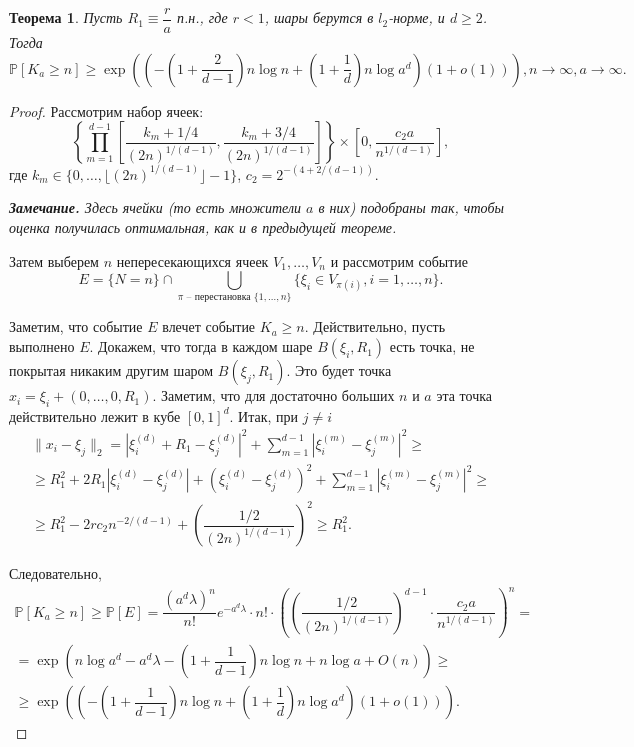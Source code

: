 \documentclass[12pt]{article}
\theoremstyle{plain}
\newtheorem{thm}{Теорема} %
\theoremstyle{definition}
\theoremstyle{remark}
\def\geq{\geqslant}
\newcommand{\PP}{\mathbb{P}}
\begin{document}
\begin{thm}
Пусть $R_1\equiv \dfrac{r}{a}$ п.н., где $r<1$, шары берутся в $l_2$-норме, и $d\geq 2$. Тогда $$\PP[K_a \geq n] \geq \exp \left(\left(-\left(1+\dfrac{2}{d-1}\right)n\log n + \left(1 + \dfrac{1}{d}\right) n\log a^d \right)(1 + o(1))\right), n \to \infty, a\to \infty.$$
\end{thm}{}

\begin{proof}
 Рассмотрим набор ячеек: $$\left\{\prod\limits_{m=1}^{d-1}\left[\dfrac{k_m+1/4}{(2n)^{1/(d-1)}}, \dfrac{k_m+3/4}{(2n)^{1/(d-1)}}\right]\right\} \times \left[0, \dfrac{c_2a}{n^{1/(d-1)}}\right],$$
    где $k_m \in \{0, \ldots, \lfloor (2n)^{1/(d-1)}\rfloor-1\}$, $c_2 = 2^{-(4+2/(d-1))}$. 
    
    {\it {\bf Замечание.}  Здесь ячейки (то есть множители $a$ в них) подобраны так, чтобы оценка получилась оптимальная, как и в предыдущей теореме.}
    
    Затем выберем $n$ непересекающихся ячеек $V_1, \ldots, V_n$  и рассмотрим событие $$E = \{N=n\}\cap \bigcup\limits_{\pi \text{ -- перестановка } \{1, \ldots, n\}} \{\xi_i \in V_{\pi(i)}, i = 1, \ldots, n\}.$$
    
                         
    Заметим, что событие $E$ влечет событие $K_a \geq n$. Действительно, пусть выполнено $E$. Докажем, что тогда в каждом шаре $B(\xi_i, R_1)$ есть точка, не покрытая никаким другим шаром $B(\xi_j, R_1)$. Это будет точка $x_i = \xi_i + (0, \ldots, 0, R_1)$. Заметим, что для достаточно больших $n$ и $a$ эта точка действительно лежит в кубе $[0, 1]^d$. Итак, при $j \not= i$
    \begin{multline*}
        \|x_i - \xi_j\|_2 = 
        |\xi_i^{(d)} + R_1 - \xi_j^{(d)} |^2 + \sum_{m=1}^{d-1}|\xi_i^{(m)} - \xi_j^{(m)}|^2 \geq\\
        \geq R_1^2 + 2R_1|\xi_i^{(d)} - \xi_j^{(d)}| + (\xi_i^{(d)} - \xi_j^{(d)})^2  + \sum_{m=1}^{d-1}|\xi_i^{(m)} - \xi_j^{(m)}|^2 \geq \\
        \geq R_1^2 - 2rc_2n^{-2/(d-1)} + \left(\dfrac{1/2}{(2n)^{1/(d-1)}}\right)^2 \geq R_1^2.
    \end{multline*}{}
    
    
    Следовательно, 
    \begin{multline*}
        \PP[K_a\geq n] \geq \PP[E] = \dfrac{(a^d\lambda)^n}{n!}e^{-a^d\lambda}\cdot n!\cdot \left(\left(\dfrac{1/2}{(2n)^{1/(d-1)}}\right)^{d-1}\cdot \dfrac{c_2a}{n^{1/(d-1)}}\right)^n = \\
        =\exp\left(n\log a^d - a^d\lambda - \left(1+\dfrac{1}{d-1}\right)n\log n + n\log a +  O(n)\right) \geq \\
        \geq
        \exp \left(\left(-\left(1+\dfrac{1}{d-1}\right)n\log n + \left(1+\dfrac{1}{d}\right)n\log a^d\right) (1+o(1))\right).
    \end{multline*}{}
    
\end{proof}{}
\end{document}
